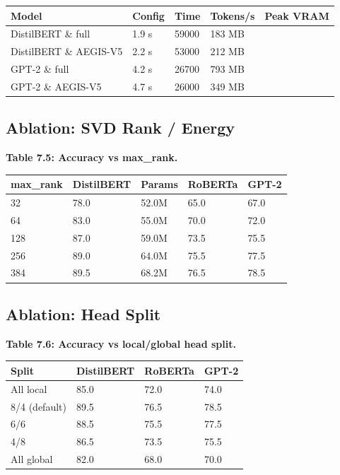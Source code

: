 \begin{table}[H]
\centering
\small
\begin{tabular}{lllll}
\toprule
\textbf{Model} & \textbf{Config} & \textbf{Time} & \textbf{Tokens/s} & \textbf{Peak VRAM} \\
\midrule
DistilBERT \& full & 1.9 s & 59000 & 183 MB \\
DistilBERT \& AEGIS-V5 & 2.2 s & 53000 & 212 MB \\
GPT-2 \& full & 4.2 s & 26700 & 793 MB \\
GPT-2 \& AEGIS-V5 & 4.7 s & 26000 & 349 MB \\
\bottomrule
\end{tabular}
\end{table}

\subsection{Ablation: SVD Rank / Energy}

\textbf{Table 7.5: Accuracy vs max\_rank.}

\begin{table}[H]
\centering
\small
\begin{tabular}{lllll}
\toprule
\textbf{max\_rank} & \textbf{DistilBERT} & \textbf{Params} & \textbf{RoBERTa} & \textbf{GPT-2} \\
\midrule
32 & 78.0 & 52.0M & 65.0 & 67.0 \\
64 & 83.0 & 55.0M & 70.0 & 72.0 \\
128 & 87.0 & 59.0M & 73.5 & 75.5 \\
256 & 89.0 & 64.0M & 75.5 & 77.5 \\
384 & 89.5 & 68.2M & 76.5 & 78.5 \\
\bottomrule
\end{tabular}
\end{table}

\subsection{Ablation: Head Split}

\textbf{Table 7.6: Accuracy vs local/global head split.}

\begin{table}[H]
\centering
\small
\begin{tabular}{llll}
\toprule
\textbf{Split} & \textbf{DistilBERT} & \textbf{RoBERTa} & \textbf{GPT-2} \\
\midrule
All local & 85.0 & 72.0 & 74.0 \\
8/4 (default) & 89.5 & 76.5 & 78.5 \\
6/6 & 88.5 & 75.5 & 77.5 \\
4/8 & 86.5 & 73.5 & 75.5 \\
All global & 82.0 & 68.0 & 70.0 \\
\bottomrule
\end{tabular}
\end{table}


